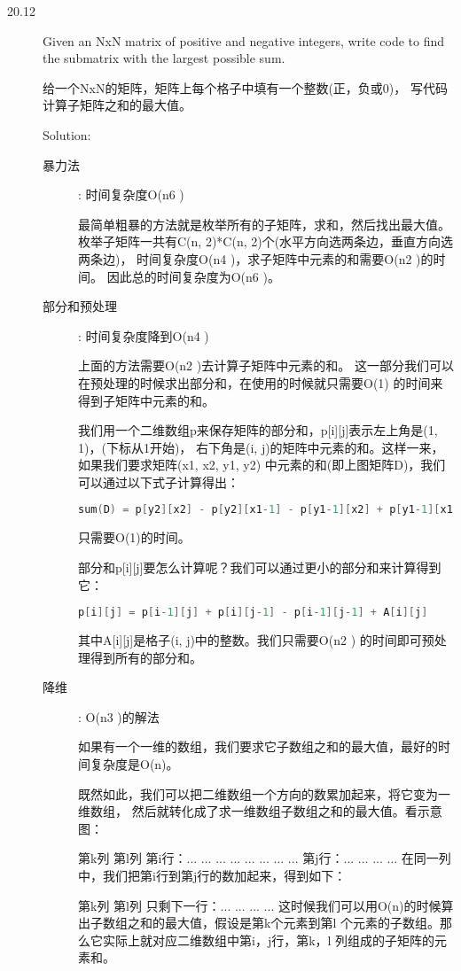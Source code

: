 \begin{description}
\item[20.12] Given an NxN matrix of positive and negative integers, write code to find the submatrix with the largest possible sum.

给一个NxN的矩阵，矩阵上每个格子中填有一个整数(正，负或0)， 写代码计算子矩阵之和的最大值。

Solution:

\begin{description}
\item[暴力法]: 时间复杂度O(n6 )

最简单粗暴的方法就是枚举所有的子矩阵，求和，然后找出最大值。 枚举子矩阵一共有C(n, 2)*C(n, 2)个(水平方向选两条边，垂直方向选两条边)， 时间复杂度O(n4 )，求子矩阵中元素的和需要O(n2 )的时间。 因此总的时间复杂度为O(n6 )。

\item[部分和预处理]: 时间复杂度降到O(n4 )

上面的方法需要O(n2 )去计算子矩阵中元素的和。 这一部分我们可以在预处理的时候求出部分和，在使用的时候就只需要O(1) 的时间来得到子矩阵中元素的和。

我们用一个二维数组p来保存矩阵的部分和，p[i][j]表示左上角是(1, 1)，(下标从1开始)， 右下角是(i, j)的矩阵中元素的和。这样一来，如果我们要求矩阵(x1, x2, y1, y2) 中元素的和(即上图矩阵D)，我们可以通过以下式子计算得出：
\begin{lstlisting}[language=C++]
sum(D) = p[y2][x2] - p[y2][x1-1] - p[y1-1][x2] + p[y1-1][x1-1]
\end{lstlisting}
只需要O(1)的时间。

部分和p[i][j]要怎么计算呢？我们可以通过更小的部分和来计算得到它：
\begin{lstlisting}[language=C++]
p[i][j] = p[i-1][j] + p[i][j-1] - p[i-1][j-1] + A[i][j]
\end{lstlisting}
其中A[i][j]是格子(i, j)中的整数。我们只需要O(n2 ) 的时间即可预处理得到所有的部分和。

\item[降维]: O(n3 )的解法

如果有一个一维的数组，我们要求它子数组之和的最大值，最好的时间复杂度是O(n)。 

既然如此，我们可以把二维数组一个方向的数累加起来，将它变为一维数组， 然后就转化成了求一维数组子数组之和的最大值。看示意图：

            第k列 第l列
第i行：...   ...     ...     ...
      ...   ...     ...     ...
第j行：...   ...     ...     ...
在同一列中，我们把第i行到第j行的数加起来，得到如下：

                第k列 第l列
只剩下一行：...   ...     ...     ...
这时候我们可以用O(n)的时候算出子数组之和的最大值，假设是第k个元素到第l 个元素的子数组。那么它实际上就对应二维数组中第i，j行，第k，l 列组成的子矩阵的元素和。


\end{description}
\end{description}
